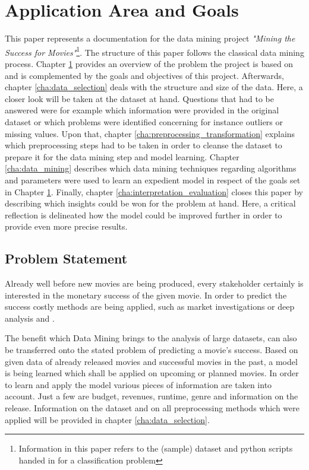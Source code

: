 \chapter{Application Area and Goals}
\label{cha:area_goals}
This paper represents a documentation for the data mining project \textit{"Mining the Success for Movies"}\footnote{ Information in this paper refers to the (sample) dataset and python scripts handed in for a classification problem}. The structure of this paper follows the classical data mining process. Chapter \ref{cha:area_goals} provides an overview of the problem the project is based on and is complemented by the goals and objectives of this project. Afterwards, chapter \ref{cha:data_selection} deals with the structure and size of the data. Here, a closer look will be taken at the dataset at hand. Questions that had to be answered were for example which information were provided in the original dataset or which problems were identified concerning for instance outliers or missing values. Upon that, chapter \ref{cha:preprocessing_transformation} explains which preprocessing steps had to be taken in order to cleanse the dataset to prepare it for the data mining step and model learning. Chapter \ref{cha:data_mining} describes which data mining techniques regarding algorithms and parameters were used to learn an expedient model in respect of the goals set in Chapter \ref{cha:area_goals}. Finally, chapter \ref{cha:interpretation_evaluation} closes this paper by describing which insights could be won for the problem at hand. Here, a critical reflection is delineated how the model could be improved further in order to provide even more precise results.

\section{Problem Statement}
Already well before new movies are being produced, every stakeholder certainly is interested in the monetary success of the given movie. In order to predict the success costly methods are being applied, such as market investigations or deep analysis and .

The benefit which Data Mining brings to the analysis of large datasets, can also be transferred onto the stated problem of predicting a movie's success. Based on given data of already released movies and successful movies in the past, a model is being learned which shall be applied on upcoming or planned movies. In order to learn and apply the model various pieces of information are taken into account. Just a few are budget, revenues, runtime, genre and information on the release. Information on the dataset and on all preprocessing methods which were applied will be provided in chapter \ref{cha:data_selection}.

